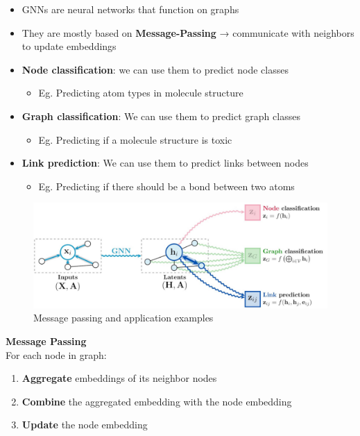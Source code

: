 \begin{itemize}
    \item GNNs are neural networks that function on graphs
    \item They are mostly based on \textbf{Message-Passing} → communicate with neighbors to update embeddings
    \item \textbf{Node classification}: we can use them to predict node classes
    \begin{itemize}
        \item Eg. Predicting atom types in molecule structure
    \end{itemize}
    \item \textbf{Graph classification}: We can use them to predict graph classes
    \begin{itemize}
        \item Eg. Predicting if a molecule structure is toxic
    \end{itemize}
    \item \textbf{Link prediction}: We can use them to predict links between nodes
    \begin{itemize}
        \item Eg. Predicting if there should be a bond between two atoms
    \end{itemize}
\end{itemize}

\begin{figure}[h!t]
    \centering
    \includegraphics[width=0.65\linewidth]{messagepassing.png}
    \caption{Message passing and application examples}
    \label{fig:enter-label}
\end{figure}

\noindent
\textbf{Message Passing}\\
For each node in graph:
\begin{enumerate}
    \item \textbf{Aggregate} embeddings of its neighbor nodes
    \item \textbf{Combine} the aggregated embedding with the node embedding
    \item  \textbf{Update} the node embedding
\end{enumerate}

